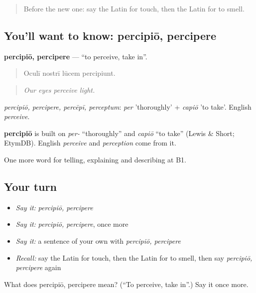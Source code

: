\label{lesson:LA-C519-percipio}



\begin{quote}
Before the new one: say the Latin for touch, then the Latin for to smell.
\end{quote}

\subsection*{You'll want to know: percipiō, percipere}
\textbf{percipiō, percipere} — \textquotedblleft{}to perceive, take in\textquotedblright{}.

\begin{quote}
Oculī nostrī lūcem percipiunt.
\end{quote}

\begin{quote}
\emph{Our eyes perceive light.}
\end{quote}

\emph{percipiō, percipere, percēpī, perceptum}: \emph{per} 'thoroughly' + \emph{capiō} 'to take'. English \emph{perceive}.

\begin{cousinweb}
\textbf{percipiō} is built on \emph{per-} \textquotedblleft{}thoroughly\textquotedblright{} and \emph{capiō} \textquotedblleft{}to take\textquotedblright{} (Lewis \& Short; EtymDB). English \emph{perceive} and \emph{perception} come from it.
\end{cousinweb}

\begin{grammarlens}[title={What you've built}]
One more word for telling, explaining and describing at B1.
\end{grammarlens}

\subsection*{Your turn}
\begin{itemize}
\raggedright
  \item \emph{Say it:} \emph{percipiō, percipere}
  \item \emph{Say it:} \emph{percipiō, percipere}, once more
  \item \emph{Say it:} a sentence of your own with \emph{percipiō, percipere}
  \item \emph{Recall:} say the Latin for touch, then the Latin for to smell, then say \emph{percipiō, percipere} again
\end{itemize}

\begin{tcolorbox}[breakable,colback=teal!4,colframe=teal!35!black,title={Before you move on}]
What does percipiō, percipere mean? (\textquotedblleft{}To perceive, take in\textquotedblright{}.) Say it once more.
\end{tcolorbox}
